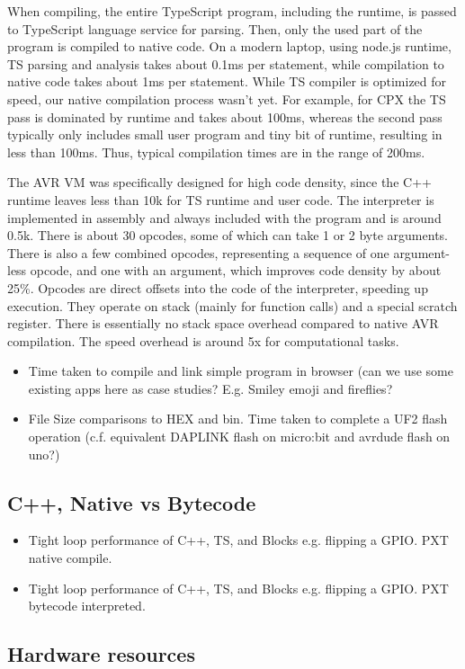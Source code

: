 When compiling, the entire TypeScript program, including the runtime, is
passed to TypeScript language service for parsing. Then, only the used
part of the program is compiled to native code.
On a modern laptop, using node.js runtime, TS parsing and analysis takes about 0.1ms per statement,
while compilation to native code takes about 1ms per statement.
While TS compiler is optimized for speed, our native compilation process wasn't yet.
For example, for CPX the TS pass is dominated by runtime and takes about 100ms,
whereas the second pass typically only includes small user program
and tiny bit of runtime, resulting in less than 100ms. Thus, typical compilation
times are in the range of 200ms.

The AVR VM was specifically designed for high code density, since the C++ runtime
leaves less than 10k for TS runtime and user code.
The interpreter is implemented in assembly and always included with the program and is around 0.5k.
There is about 30 opcodes, some of which can take 1 or 2 byte arguments. 
There is also a few combined opcodes, representing a sequence of one argument-less opcode,
and one with an argument, which improves code density by about 25\%.
Opcodes are direct offsets into the code of the interpreter, speeding up execution.
They operate on stack (mainly for function calls) and a special scratch register.
There is essentially no stack space overhead compared to native AVR compilation.
The speed overhead is around 5x for computational tasks.



\begin{itemize}
\item Time taken to compile and link simple program in browser (can we use some existing apps 
      here as case studies? E.g. Smiley emoji and fireflies?
\item \UF File Size comparisons to HEX and bin. Time taken to complete a UF2 flash operation 
    (c.f. equivalent DAPLINK flash on micro:bit and avrdude flash on uno?)
\end{itemize}

\subsection{C++, Native vs Bytecode}
\begin{itemize}
\item Tight loop performance of C++, TS, and Blocks e.g. flipping a GPIO. PXT native compile.
\item Tight loop performance of C++, TS, and Blocks e.g. flipping a GPIO. PXT bytecode interpreted.
\end{itemize}

\subsection{Hardware resources}


